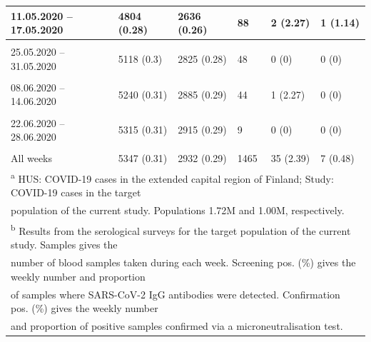 \begin{tabular}{l|l|l|l|l|l}
\hline
11.05.2020 – 17.05.2020 & 4804 (0.28) & 2636 (0.26) & 88 & 2 (2.27) & 1 (1.14)\\
\hline
\cellcolor{gray!6}{18.05.2020 – 24.05.2020} & \cellcolor{gray!6}{4987 (0.29)} & \cellcolor{gray!6}{2747 (0.28)} & \cellcolor{gray!6}{47} & \cellcolor{gray!6}{0 (0)} & \cellcolor{gray!6}{0 (0)}\\
\hline
25.05.2020 – 31.05.2020 & 5118 (0.3) & 2825 (0.28) & 48 & 0 (0) & 0 (0)\\
\hline
\cellcolor{gray!6}{01.06.2020 – 07.06.2020} & \cellcolor{gray!6}{5200 (0.3)} & \cellcolor{gray!6}{2863 (0.29)} & \cellcolor{gray!6}{48} & \cellcolor{gray!6}{2 (4.17)} & \cellcolor{gray!6}{1 (2.08)}\\
\hline
08.06.2020 – 14.06.2020 & 5240 (0.31) & 2885 (0.29) & 44 & 1 (2.27) & 0 (0)\\
\hline
\cellcolor{gray!6}{15.06.2020 – 21.06.2020} & \cellcolor{gray!6}{5279 (0.31)} & \cellcolor{gray!6}{2899 (0.29)} & \cellcolor{gray!6}{23} & \cellcolor{gray!6}{0 (0)} & \cellcolor{gray!6}{0 (0)}\\
\hline
22.06.2020 – 28.06.2020 & 5315 (0.31) & 2915 (0.29) & 9 & 0 (0) & 0 (0)\\
\hline
\cellcolor{gray!6}{29.06.2020 – 04.07.2020} & \cellcolor{gray!6}{5347 (0.31)} & \cellcolor{gray!6}{2932 (0.29)} & \cellcolor{gray!6}{22} & \cellcolor{gray!6}{2 (9.09)} & \cellcolor{gray!6}{0 (0)}\\
\hline
All weeks & 5347 (0.31) & 2932 (0.29) & 1465 & 35 (2.39) & 7 (0.48)\\
\hline
\multicolumn{6}{l}{\textsuperscript{a} HUS: COVID-19 cases in the extended capital region of Finland; Study: COVID-19 cases in the target }\\
\multicolumn{6}{l}{population of the current study. Populations 1.72M and 1.00M, respectively.}\\
\multicolumn{6}{l}{\textsuperscript{b} Results from the serological surveys for the target population of the current study. Samples gives the}\\
\multicolumn{6}{l}{number of blood samples taken during each week. Screening pos. (\%) gives the weekly number and proportion}\\
\multicolumn{6}{l}{of samples where SARS-CoV-2 IgG antibodies were detected. Confirmation pos. (\%) gives the weekly number}\\
\multicolumn{6}{l}{and proportion of positive samples confirmed via a microneutralisation test.}\\
\end{tabular}
